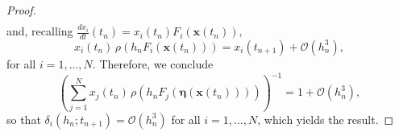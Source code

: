 \documentclass[10pt,a4paper]{amsart}
\begin{document}
\begin{proof}
\begin{equation*}
\begin{split}
        \end{split}
    \end{equation*}
    and, recalling $\frac{dx_i}{dt}(t_n)=x_i(t_n)F_i(\bm{x}(t_n)),$
    \begin{equation}\label{eq_tmp_1}
        x_i(t_n) \, \rho\left( h_n F_i(\bm{x}(t_n)) \right) = x_i(t_{n+1}) + \mathcal{O}(h_n^3),
    \end{equation}
    for all \( i = 1, \dots, N \). Therefore, we conclude
    \begin{equation}\label{eq:Normal_ordine_3}
        \left( \sum_{j=1}^N x_j(t_n) \, \rho\left( h_n F_j(\bm{\eta}(\bm{x}(t_n))) \right) \right)^{-1} = 1 + \mathcal{O}(h_n^3),
    \end{equation}
    so that \( \delta_i(h_n; t_{n+1}) = \mathcal{O}(h_n^3) \) for all \( i = 1, \dots, N \), which yields the result.
\end{proof}
\end{document}
